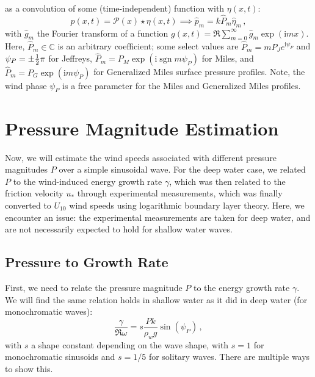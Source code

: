 \documentclass{jfm}
\let\Oldsection\section
\renewcommand{\section}{\FloatBarrier\Oldsection}
\let\Oldsubsection\subsection
\renewcommand{\subsection}{\FloatBarrier\Oldsubsection}
\newcommand{\GenP}{\hat{P}_m}
\DeclareMathOperator{\sgn}{sgn}
\newcommand{\im}{\mathrm{i}}
\begin{document}
as a convolution of some (time-independent) function with $\eta(x,t)$:
\begin{equation}
  p(x,t) = \mathcal{P}(x) \star \eta(x,t) \implies \hat{p}_m = k \GenP
    \hat{\eta}_m \,,
\end{equation}
with $\hat{g}_m$ the Fourier transform of a function $g(x,t) =
\Re{\sum_{m=0}^{\infty} \hat{g}_m \exp(\im m x)}$.
Here, $\GenP \in \mathbb{C}$ is an arbitrary coefficient; some select
values are
$\GenP = m P_J e^{\im \psi_P}$ and $\psi_P = \pm {\textstyle\frac{1}{2}} \pi$
for Jeffreys, $\GenP = P_M \exp(\im \sgn{m} \psi_P)$ for Miles, and
$\GenP = P_G \exp(\im m \psi_P)$ for Generalized Miles surface pressure
profiles.
Note, the wind phase $\psi_P$ is a free parameter for the Miles and
Generalized Miles profiles.

\section{Pressure Magnitude Estimation}
Now, we will estimate the wind speeds associated with different pressure
magnitudes $P$ over a simple sinusoidal wave.
For the deep water case, we related $P$ to the wind-induced energy growth
rate $\gamma$, which was then related to the friction velocity $u_*$
through experimental measurements, which was finally converted to
$U_{10}$ wind speeds using logarithmic boundary layer theory.
Here, we encounter an issue: the experimental measurements are taken for
deep water, and are not necessarily expected to hold for shallow water
waves.

\subsection{Pressure to Growth Rate}
First, we need to relate the pressure magnitude $P$ to the energy growth
rate $\gamma$.
We will find the same relation holds in shallow water as it did in deep
water (for monochromatic waves):
\begin{equation}
  \frac{\gamma}{\Re{\omega}} = s \frac{P k}{\rho_w g} \sin(\psi_P) \,,
  \label{eq:gamma_vs_P}
\end{equation}
with $s$ a shape constant depending on the wave shape, with $s=1$ for
monochromatic sinusoids and $s=1/5$ for solitary waves.
There are multiple ways to show this.
\end{document}

